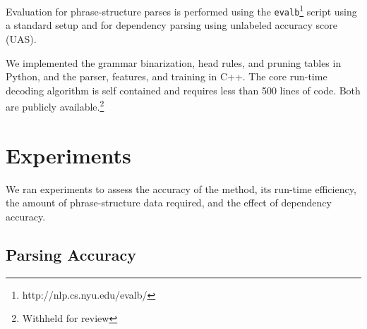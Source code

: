 \documentclass[11pt,letterpaper]{article}
\begin{document}
Evaluation for phrase-structure parses is performed using the \texttt{evalb}\footnote{http://nlp.cs.nyu.edu/evalb/} script using a standard setup and for dependency parsing using unlabeled accuracy score (UAS).

We implemented the grammar binarization, head rules, and pruning
tables in Python, and the parser, features, and training in C++. The
core run-time decoding algorithm is self contained and requires less
than 500 lines of code. Both are publicly available.\footnote{Withheld
  for review}












\section{Experiments}

We ran experiments to assess the accuracy of the method, its run-time efficiency, the amount of phrase-structure data required, and the effect of dependency accuracy.

\subsection{Parsing Accuracy}
\end{document}
